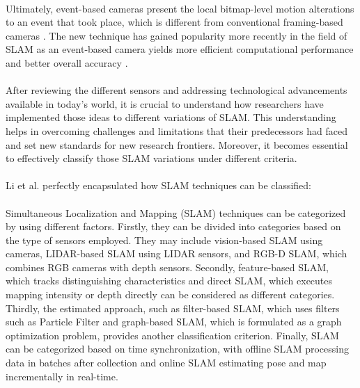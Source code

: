\paragraph*{}
Ultimately, event-based cameras present the local bitmap-level motion alterations to an event that took place, which is different from conventional framing-based cameras \cite{udugama2023evolution}. The new technique has gained popularity more recently in the field of SLAM as an event-based camera yields more efficient computational performance and better overall accuracy \cite{huang2023event}.

\paragraph*{}
After reviewing the different sensors and addressing technological advancements available in today’s world, it is crucial to understand how researchers have implemented those ideas to different variations of SLAM. This understanding helps in overcoming challenges and limitations that their predecessors had faced and set new standards for new research frontiers. Moreover, it becomes essential to effectively classify those SLAM variations under different criteria.

\paragraph*{}
Li et al.\cite{li2024object} perfectly encapsulated how SLAM techniques can be classified: 

\paragraph*{}
Simultaneous Localization and Mapping (SLAM) techniques can be categorized by using different factors. Firstly, they can be divided into categories based on the type of sensors employed. They may include vision-based SLAM using cameras, LIDAR-based SLAM using LIDAR sensors, and RGB-D SLAM, which combines RGB cameras with depth sensors. Secondly, feature-based SLAM, which tracks distinguishing characteristics and direct SLAM, which executes mapping intensity or depth directly can be considered as different categories. Thirdly, the estimated approach, such as filter-based SLAM, which uses filters such as Particle Filter and graph-based SLAM, which is formulated as a graph optimization problem, provides another classification criterion. Finally, SLAM can be categorized based on time synchronization, with offline SLAM processing data in batches after collection and online SLAM estimating pose and map incrementally in real-time.

